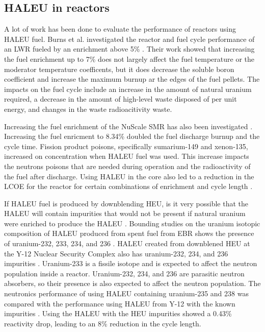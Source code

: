 \subsection{HALEU in reactors}
A lot of work has been done to evaluate the performance of reactors 
using \gls{HALEU} fuel. Burns et al. investigated the reactor and fuel cycle 
performance of an \gls{LWR} fueled by an enrichment above 5\% \cite{burns_reactor_2020}.
Their work showed that increasing the fuel enrichment up to 7\% does not 
largely affect the fuel temperature or the moderator temperature coefficents,
but it does decrease the soluble boron coefficient and increase the maximum 
burnup ar the edges of the fuel pellets. The impacts on the fuel cycle include 
an increase in the amount of natural uranium required, a decrease in the 
amount of high-level waste disposed of per unit energy, and changes in the 
waste radioacitivity waste. 

Increasing the fuel enrichment of the NuScale \gls{SMR} has also been investigated 
\cite{carlson_implications_2022}. Increasing the fuel enricment to 8.34\% doubled the 
fuel discharge burnup and the cycle time. Fission product poisons, specifically 
sumarium-149 and xenon-135, increased on concentration when \gls{HALEU} fuel was used. 
This increase impacts the neutrons poisons that are needed during operation and the 
radioactivity of the fuel after discharge. Using \gls{HALEU} in the core also led 
to a reduction in the \gls{LCOE} for the reactor for certain combinations of 
enrichment and cycle length \cite{carlson_economic_2020,carlson_implications_2022}.

If \gls{HALEU} fuel is produced by downblending \gls{HEU}, is it very possible that 
the \gls{HALEU} will contain impurities that would not be present if natural uranium 
were enriched to produce the \gls{HALEU} \cite{noauthor_establishing_2022}. Bounding 
studies on the uranium isotopic 
composition of \gls{HALEU} produced from spent fuel from \gls{EBR} shows the presence 
of uranium-232, 233, 234, and 236 \cite{vaden_isotopic_2018}. \gls{HALEU} created from 
downblened \gls{HEU} at the Y-12 Nuclear Security Complex also has uranium-232, 234, and 
236 impurities \cite{nelson_foreign_2010}. Uranium-233 is a fissile 
isotope and is expected to affect the neutron population inside a reactor. Uranium-232, 
234, and 236 are parasitic neutron absorbers, so their presence is also expected to affect 
the neutron population. The neutronics performance of using \gls{HALEU} containing
uranium-235 and 238 was compared with the performance using \gls{HALEU} from Y-12 with the 
known impurities \cite{celikten_effects_2021}. Using 
the \gls{HALEU} with the \gls{HEU} impurities showed a 0.43\% reactivity drop, leading to 
an 8\% reduction in the cycle length. 
